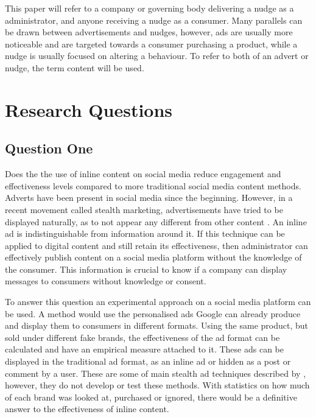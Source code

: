 \documentclass[11pt]{article} %
\begin{document}
This paper will refer to a company or governing body delivering a nudge as a administrator, and anyone receiving a nudge as a consumer. Many parallels can be drawn between advertisements and nudges, however, ads are usually more noticeable and are targeted towards a consumer purchasing a product, while a nudge is usually focused on altering a behaviour. To refer to both of an advert or nudge, the term content will be used.

\section{Research Questions}
\subsection{Question One}
Does the the use of inline content on social media reduce engagement and effectiveness levels compared to more traditional social media content methods.
Adverts have been present in social media since the beginning. However, in a recent movement called stealth marketing, advertisements have tried to be displayed naturally, as to not appear any different from other content \citep{Stealth}. An inline ad is indistinguishable from information around it. If this technique can be applied to digital content and still retain its effectiveness, then administrator can effectively publish content on a social media platform without the knowledge of the consumer. This information is crucial to know if a company can display messages to consumers without knowledge or consent. \par%

To answer this question an experimental approach on a social media platform can be used. A method would use the personalised ads Google can already produce and display them to consumers in different formats. Using the same product, but sold under different fake brands, the effectiveness of the ad format can be calculated and have an empirical measure attached to it. These ads can be displayed in the traditional ad format, as an inline ad or hidden as a post or comment by a user. These are some of main stealth ad techniques described by \cite{Stealth}, however, they do not develop or test these methods. With statistics on how much of each brand was looked at, purchased or ignored, there would be a definitive answer to the effectiveness of inline content.  \par
\end{document}
